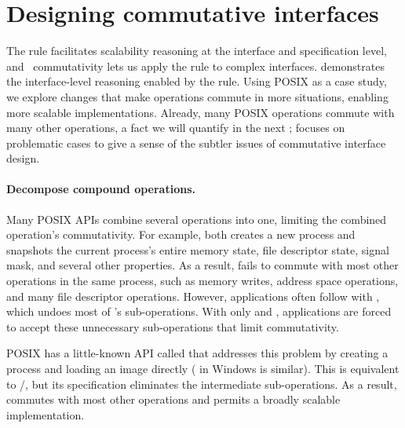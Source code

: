 \section{Designing commutative interfaces}
\label{sec:posix}


\noindent
The rule facilitates scalability reasoning at the interface and
specification level, and \SIM\ commutativity lets us apply the rule to
complex interfaces.
 demonstrates the interface-level reasoning enabled by the
rule. Using POSIX as a case study, we explore changes that make operations
commute in more situations, enabling more scalable implementations.
%
Already, many POSIX operations commute with many other
operations, a fact we will quantify in the next ;
 focuses on
problematic cases to give a sense of the subtler issues of commutative
interface design.
%

\paragraph{Decompose compound operations.}

Many POSIX APIs combine several operations into one, limiting the
combined operation's commutativity.
For example,
 both creates a new process and snapshots the current process's
entire memory state, file descriptor state, signal mask, and several
other properties.  As a result,  fails to commute
with most other operations in the same process, such as memory writes,
address space operations, and many file descriptor operations.
However, applications often follow  with
, which undoes most of 's sub-operations.
With only  and , applications are forced to accept
these unnecessary sub-operations that limit commutativity.

POSIX has a little-known API called  that
addresses this problem by creating a process and loading an image
directly ( in Windows is similar).  This is
equivalent to /, but its specification eliminates
the intermediate sub-operations.  As a result, 
commutes with most other operations and permits a broadly scalable
implementation.


